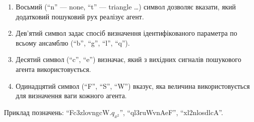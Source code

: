 \documentclass[14pt,handout,utf8]{beamer}
\begin{document}
\begin{frame}
{\begin{enumerate}
    \item
      Восьмий (``n'' --- none, ``t'' --- triangle \ldots ) символ дозволяє вказати,
      який додатковий пошуковий рух реалізує агент.

    \item
      Дев'ятий символ задає спосіб визначення ідентифікованого параметра по всьому ансамблю (``b'', ``g'', ``l'', ``q'').


    \item
      Десятий символ (``c'', ``e'') визначає, який з вихідних сигналів пошукового агента використовується.

    \item
      Одинадцятий символ (``F'', ``S'', ``W'') вказує,
      яка величина використовується для визначення ваги кожного агента.


  \end{enumerate}

  Приклад позначень:
  ``Fc3zlovngcW.$q_{x^2}$'',
  ``ql3ruWvnAeF'',
  ``xl2nlosdlcA''.

} %

\end{frame}


\end{document}
